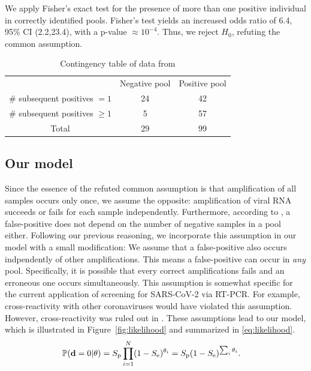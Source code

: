 \documentclass{article}
\begin{document}
We apply Fisher's exact test for the presence of more than one
positive individual in correctly identified pools. Fisher's test
yields an increased odds ratio of 6.4, 95\% CI (2.2,23.4), with a
p-value $\approx 10^{-4}$. Thus, we reject $H_0$, refuting the common
assumption.

\begin{table}[h]
\centering
\begin{tabular}{ c c c }
                                & Negative pool  & Positive pool \\%
\# subsequent positives $=1$    & 24             & 42            \\%
\# subsequent positives $\geq1$ & 5              & 57            \\%
 Total                          & 29             & 99            \\%
\end{tabular}
\caption{Contingency table of data from \cite{Salazar}}\label{table}
\end{table}

\subsection*{Our model}\label{subsec:ours}
Since the essence of the refuted common assumption is that
amplification of all samples occurs only once, we assume the opposite:
amplification of viral RNA succeeds or fails for each sample
independently. Furthermore, according to \cite{Simplistic1,
  Simplistic2, Kim, OptimalDorfmanPool}, a false-positive does not
depend on the number of negative samples in a pool either. Following
our previous reasoning, we incorporate this assumption in our model
with a small modification: We assume that a false-positive also occurs
indpendently of other amplifications. This means a false-positive can
occur in \emph{any} pool. Specifically, it is possible that every
correct amplifications fails and an erroneous one occurs
simultaneously. This assumption is somewhat specific for the current
application of screening for SARS-CoV-2 via RT-PCR. For example,
cross-reactivity with other coronaviruses would have violated this
assumption. However, cross-reactivity was ruled out in
\cite{KitComparison}. These assumptions lead to our model, which is
illustrated in Figure~\ref{fig:likelihood} and summarized in
\eqref{eq:likelihood}.
\begin{align}\label{eq:likelihood}
    \mathbb{P}(\mathbf{d}=0 | \theta) &= S_{\text{p}}\prod_{i=1}^N (1-S_{\text{e}})^{\theta_i} =
    S_{\text{p}}(1-S_\text{e})^{\sum_i\theta_i}.
\end{align}
\end{document}
